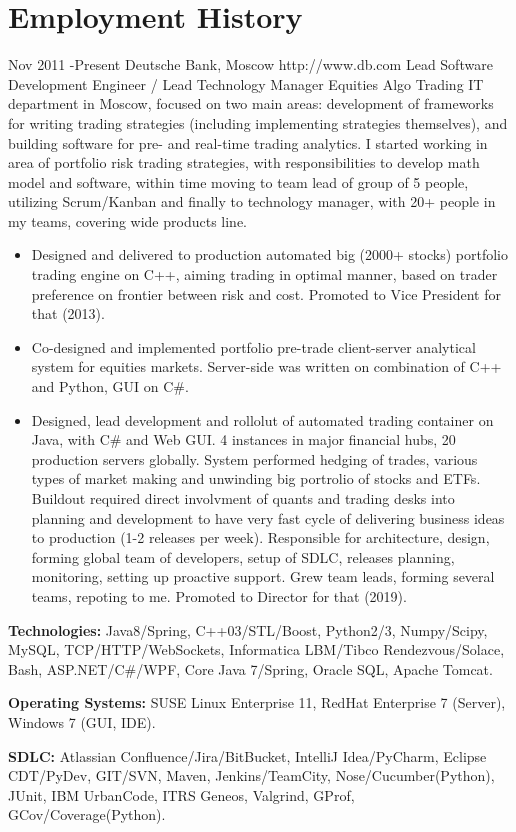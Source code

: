 \documentclass[10pt]{article} %
\begin{document}

\section{Employment History}

\job
{Nov 2011 -}{Present}
{Deutsche Bank, Moscow}
{http://www.db.com}
{Lead Software Development Engineer / Lead Technology Manager}
{Equities Algo Trading IT department in Moscow, focused on two main areas: development of frameworks for
writing trading strategies (including implementing strategies themselves), and building software 
for pre- and real-time  trading analytics. I started working in area of portfolio risk trading strategies,
with responsibilities to develop math model and software, within time moving to team lead of group of 5 people,
utilizing Scrum/Kanban and finally to technology manager, with 20+ people in my teams,
covering wide products line.}
{\begin{itemize}
\item{Designed and delivered to production automated big (2000+ stocks) portfolio trading engine on C++,
aiming trading in optimal manner, based on trader preference on frontier between risk and cost. 
Promoted to Vice President for that (2013).}
\item{Co-designed and implemented portfolio pre-trade client-server analytical system for equities markets.
Server-side was written on combination of C++ and Python, GUI on C\#.}
\item{Designed, lead development and rollolut of automated trading container on Java, with C\# and Web GUI.
4 instances in major financial hubs, 20 production servers globally. System performed hedging of trades,
various types of market making and unwinding big portrolio of stocks and ETFs. Buildout required direct
involvment of quants and trading desks into planning and development to have very fast cycle of delivering
business ideas to production (1-2 releases per week). Responsible for architecture, design, forming
global team of developers, setup of SDLC, releases planning, monitoring, setting up proactive support.
Grew team leads, forming several teams, repoting to me. Promoted to Director for that (2019).}
\end{itemize}}
{\rule{0mm}{5mm}\textbf{Technologies:} Java8/Spring, C++03/STL/Boost, Python2/3, Numpy/Scipy, MySQL, TCP/HTTP/WebSockets,
Informatica LBM/Tibco Rendezvous/Solace, Bash, ASP.NET/C\#/WPF, Core Java 7/Spring, Oracle SQL, Apache Tomcat.\\
\rule{0mm}{5mm}\textbf{Operating Systems:} SUSE Linux Enterprise 11, RedHat Enterprise 7 (Server), Windows 7 (GUI, IDE).\\
\rule{0mm}{5mm}\textbf{SDLC:} Atlassian Confluence/Jira/BitBucket, IntelliJ Idea/PyCharm, Eclipse CDT/PyDev, GIT/SVN,
Maven, Jenkins/TeamCity, Nose/Cucumber(Python), JUnit, IBM UrbanCode, ITRS Geneos, Valgrind, GProf, GCov/Coverage(Python).
}
\end{document}
